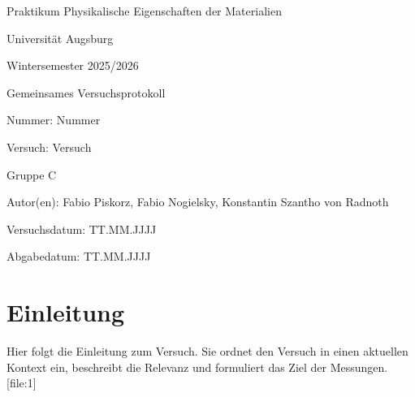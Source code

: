 \documentclass[11pt,a4paper]{article}
\numberwithin{equation}{section}
\newcommand{\Lehrveranstaltung}{Praktikum Physikalische Eigenschaften der Materialien}
\newcommand{\Universitaet}{Universität Augsburg}
\newcommand{\Semester}{Wintersemester 2025/2026}
\newcommand{\Versuchsnummer}{Nummer}
\newcommand{\Versuchstitel}{Versuch}
\newcommand{\Gruppe}{C}
\newcommand{\Versuchsdatum}{TT.MM.JJJJ}
\newcommand{\Abgabedatum}{TT.MM.JJJJ}
\newcommand{\Abgabeart}{Gemeinsames Versuchsprotokoll}
\newcommand{\Autor}{Fabio Piskorz, Fabio Nogielsky, Konstantin Szantho von Radnoth }
\begin{document}

\begin{titlepage}
    \centering
    {\Large \Lehrveranstaltung\par}
    \vspace{0.5cm}
    {\large \Universitaet\par}
    \vspace{0.5cm}
    {\large \Semester\par}
    \vspace{1.5cm}
    {\LARGE \Abgabeart\par}
    \vspace{0.5cm}
    {\Large \Versuchsnummer: \Versuchsnummer\par}
    \vspace{0.5cm}
    {\Large \Versuchstitel: \Versuchstitel\par}
    \vspace{1.5cm}
    {\large Gruppe \Gruppe\par}
    \vspace{0.5cm}
    {\large Autor(en): \Autor\par}
    \vspace{1.5cm}
    {\large Versuchsdatum: \Versuchsdatum\par}
    \vspace{0.5cm}
    {\large Abgabedatum: \Abgabedatum\par}

    \vfill
\end{titlepage}


\section{Einleitung}

Hier folgt die Einleitung zum Versuch. Sie ordnet den Versuch in einen aktuellen Kontext ein, beschreibt die Relevanz und formuliert das Ziel der Messungen. [file:1]
\newpage

\end{document}
